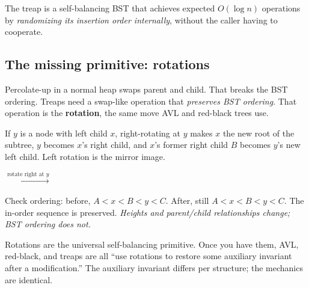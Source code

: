 \documentclass[11pt]{article}
\begin{document}
The treap is a self-balancing BST that achieves expected $O(\log n)$ operations by \emph{randomizing its insertion order internally}, without the caller having to cooperate.

\subsection*{The missing primitive: rotations}

Percolate-up in a normal heap swaps parent and child. That breaks the BST ordering. Treaps need a swap-like operation that \emph{preserves BST ordering}. That operation is the \textbf{rotation}, the same move AVL and red-black trees use.

\begin{defnbox}
If $y$ is a node with left child $x$, right-rotating at $y$ makes $x$ the new root of the subtree, $y$ becomes $x$'s right child, and $x$'s former right child $B$ becomes $y$'s new left child. Left rotation is the mirror image.
\end{defnbox}

\begin{center}
\quad $\xrightarrow{\text{rotate right at } y}$ \quad
{}
\end{center}

Check ordering: before, $A < x < B < y < C$. After, still $A < x < B < y < C$. The in-order sequence is preserved. \emph{Heights and parent/child relationships change; BST ordering does not.}

Rotations are the universal self-balancing primitive. Once you have them, AVL, red-black, and treaps are all ``use rotations to restore some auxiliary invariant after a modification.'' The auxiliary invariant differs per structure; the mechanics are identical.
\end{document}
